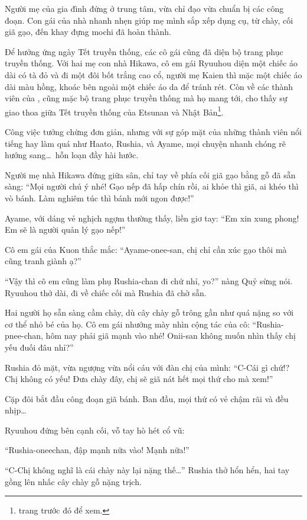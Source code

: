 \documentclass[../main.tex]{subfiles}
\begin{document}
Người mẹ của gia đình đứng ở trung tâm, vừa chỉ đạo vừa chuẩn bị các công đoạn. Con gái của nhà nhanh nhẹn giúp mẹ mình sắp xếp dụng cụ, từ chày, cối giã gạo, đến khay đựng mochi đã hoàn thành.

Để hưởng ứng ngày Tết truyền thống, các cô gái cũng đã diện bộ trang phục truyền thống. Với hai mẹ con nhà Hikawa, cô em gái Ryuuhou diện một chiếc áo dài có tà đỏ và đi một đôi bốt trắng cao cổ, người mẹ Kaien thì mặc một chiếc áo dài màu hồng, khoác bên ngoài một chiếc áo da để tránh rét. Còn về các thành viên của \hll, cũng mặc bộ trang phục truyền thống mà họ mang tới, cho thấy sự giao thoa giữa Tết truyền thống của Etsunan và Nhật Bản\footnote{trang trước đó để xem.}.

Công việc tưởng chừng đơn giản, nhưng với sự góp mặt của những thành viên nổi tiếng hay làm quá như Haato, Rushia, và Ayame, mọi chuyện nhanh chóng rẽ hướng sang\dots\ hỗn loạn đầy hài hước.

Người mẹ nhà Hikawa đứng giữa sân, chỉ tay về phía cối giã gạo bằng gỗ đã sẵn sàng: ``Mọi người chú ý nhé! Gạo nếp đã hấp chín rồi, ai khỏe thì giã, ai khéo thì vò bánh. Làm nghiêm túc thì bánh mới ngon được!''

Ayame, với dáng vẻ nghịch ngợm thường thấy, liền giơ tay: ``Em xin xung phong! Em sẽ là người quản lý gạo nếp!''

Cô em gái của Kuon thắc mắc: ``Ayame-onee-san, chị chỉ cần xúc gạo thôi mà cũng tranh giành ạ?''

``Vậy thì cô em cũng làm phụ Rushia-chan đi chứ nhỉ, yo?'' nàng Quỷ sừng nói. Ryuuhou thở dài, đi về chiếc cối mà Rushia đã chờ sẵn.

Hai người họ sẵn sàng cầm chày, dù cây chày gỗ trông gần như quá nặng so với cơ thể nhỏ bé của họ. Cô em gái nhướng mày nhìn cộng tác của cô: ``Rushia-pnee-chan, hôm nay phải giã mạnh vào nhé! Onii-san không muốn nhìn thấy chị yếu đuối đâu nhỉ?''

Rushia đỏ mặt, vừa ngượng vừa nổi cáu với đàn chị của mình: ``C-Cái gì chứ!? Chị không có yếu! Đưa chày đây, chị sẽ giã nát hết mọi thứ cho mà xem!''

Cặp đôi bắt đầu công đoạn giã bánh. Ban đầu, mọi thứ có vẻ chậm rãi và đều nhịp\dots

Ryuuhou đứng bên cạnh cối, vỗ tay hò hét cổ vũ:

``Rushia-oneechan, đập mạnh nữa vào! Mạnh nữa!''

``C-Chị không nghĩ là cái chày này lại nặng thế\dots'' Rushia thở hổn hển, hai tay gồng lên nhấc cây chày gỗ nặng trịch.
\end{document}
